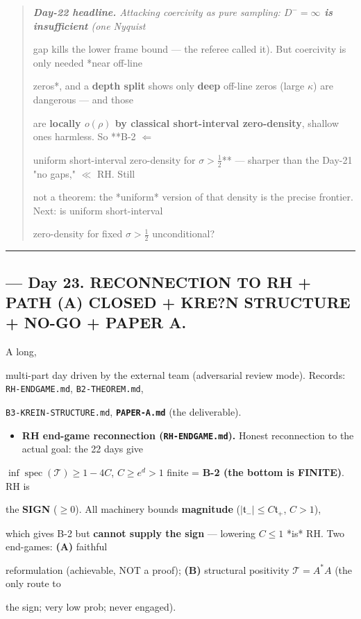 \documentclass[10pt]{article}
\begin{document}
\begin{quote}\itshape
\textbf{Day-22 headline.} Attacking coercivity as pure sampling: \textbf{$D^-=\infty$ is insufficient} (one Nyquist\par
gap kills the lower frame bound --- the referee called it). But coercivity is only needed *near off-line\par
zeros*, and a \textbf{depth split} shows only \textbf{deep} off-line zeros (large $\kappa$) are dangerous --- and those\par
are \textbf{locally $o(\rho)$ by classical short-interval zero-density}, shallow ones harmless. So **B-2 \ensuremath{\Leftarrow}\par
uniform short-interval zero-density for $\sigma>\tfrac12$** --- sharper than the Day-21 "no gaps," \ensuremath{\ll} RH. Still\par
not a theorem: the *uniform* version of that density is the precise frontier. Next: is uniform short-interval\par
zero-density for fixed $\sigma>\tfrac12$ unconditional?\par
\end{quote}

\medskip\hrule\medskip

\subsection*{ --- Day 23. RECONNECTION TO RH + PATH (A) CLOSED + KRE?N STRUCTURE + NO-GO + PAPER A.}
A long,\par
multi-part day driven by the external team (adversarial review mode). Records: \texttt{RH-ENDGAME.md}, \texttt{B2-THEOREM.md},\par
\texttt{B3-KREIN-STRUCTURE.md}, \textbf{\texttt{PAPER-A.md}} (the deliverable).\par

\begin{itemize}
\item \textbf{RH end-game reconnection (\texttt{RH-ENDGAME.md}).} Honest reconnection to the actual goal: the 22 days give
\end{itemize}
  $\inf\operatorname{spec}(\mathcal T)\ge1-4C$, $C\ge e^d>1$ finite = \textbf{B-2 (the bottom is FINITE)}. RH is\par
  the \textbf{SIGN} ($\ge0$). All machinery bounds \textbf{magnitude} ($|\mathfrak t_-|\le C\mathfrak t_+$, $C>1$),\par
  which gives B-2 but \textbf{cannot supply the sign} --- lowering $C\le1$ *is* RH. Two end-games: \textbf{(A)} faithful\par
  reformulation (achievable, NOT a proof); \textbf{(B)} structural positivity $\mathcal T=A^*A$ (the only route to\par
  the sign; very low prob; never engaged).\par
\end{document}

